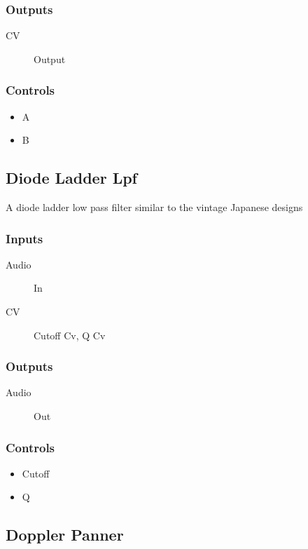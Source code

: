\subsubsection{Outputs}
\begin{description}
\item [CV] Output
\end{description}

\subsubsection{Controls}
\begin{itemize}
\item A
\item B
\end{itemize}

\subsection{Diode Ladder Lpf}

A diode ladder low pass filter similar to the vintage Japanese designs



\subsubsection{Inputs}
\begin{description}
\item [Audio] In
\item [CV] Cutoff Cv, Q Cv
\end{description}

\subsubsection{Outputs}
\begin{description}
\item [Audio] Out
\end{description}

\subsubsection{Controls}
\begin{itemize}
\item Cutoff
\item Q
\end{itemize}

\subsection{Doppler Panner}


